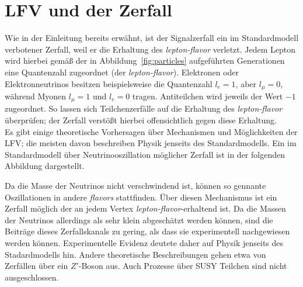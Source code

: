 \section{\texorpdfstring{LFV und der Zerfall \signal}{Jpsi to eµ}}
%
Wie in der Einleitung bereits erwähnt, ist der Signalzerfall \signal ein im Standardmodell verbotener Zerfall, weil er die Erhaltung des \textit{lepton-flavor} verletzt. Jedem Lepton wird hierbei gemäß der in Abbildung~\ref{fig:particles} aufgeführten Generationen eine Quantenzahl zugeordnet (der \textit{lepton-flavor}). Elektronen oder Elektronneutrinos besitzen beispielsweise die Quantenzahl $l_e=1$, aber $l_\mu=0$, während Myonen $l_\mu=1$ und $l_e=0$ tragen. Antiteilchen wird jeweils der Wert $-1$ zugeordnet. So lassen sich Teilchenzerfälle auf die Erhaltung des \textit{lepton-flavor} überprüfen; der Zerfall \signal verstößt hierbei offensichtlich gegen diese Erhaltung.\\
%
Es gibt einige theoretische Vorhersagen über Mechanismen und Möglichkeiten der LFV; die meisten davon beschreiben Physik jenseits des Standardmodells. Ein im Standardmodell über Neutrinooszillation möglicher Zerfall ist in der folgenden Abbildung dargestellt.
%
\begin{figure}[H]
  \centering
  \label{fig:lfv_nu}
\end{figure}
%
Da die Masse der Neutrinos nicht verschwindend ist, können so gennante Oszillationen in andere \textit{flavors} stattfinden. Über diesen Mechanismus ist ein Zerfall möglich der an jedem Vertex \textit{lepton-flavor}-erhaltend ist. Da die Massen der Neutrinos allerdings als sehr klein abgeschätzt werden können, sind die Beiträge dieses Zerfallskanals zu gering, als dass sie experimentell nachgewiesen werden können. Experimentelle Evidenz deutete daher auf Physik jenseits des Stadardmodells hin. Andere theoretische Beschreibungen gehen etwa von Zerfällen über ein $Z'$-Boson aus.\cite{zprime} Auch Prozesse über SUSY Teilchen sind nicht ausgeschlossen\cite{susy_gut1}\cite{susy_gut2}.
